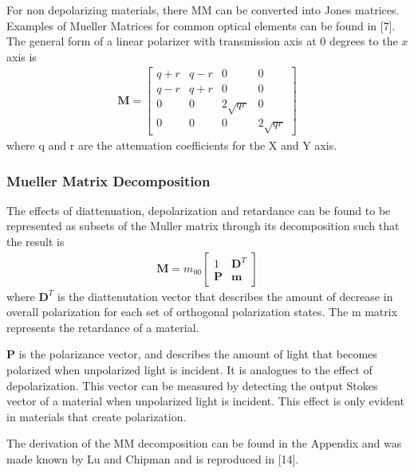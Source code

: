 For non depolarizing materials, there MM can be converted into Jones matrices.   Examples of Mueller Matrices for common optical elements can be found in [7].  The general form of a linear polarizer with transmission axis at 0 degrees to the $x$ axis is
%
\begin{align}
    \mathbf{M} =
    \begin{bmatrix}
        q + r & q - r & 0 & 0 \\
        q-r & q+r & 0  & 0 \\
        0 & 0 & 2\sqrt{qr} & 0 \\
        0 & 0 & 0 & 2\sqrt{qr}
    \end{bmatrix}
\end{align}
%
where q and r are the attenuation coefficients for the X and Y axis.

\subsubsection{Mueller Matrix Decomposition}

The effects of diattenuation, depolarization and retardance can be found to be represented as subsets of the Muller matrix through its decomposition such that the result is
\begin{align}
    \mathbf{M} = m_{00}
    \begin{bmatrix}
        1 & \mathbf{D}^T \\
        \mathbf{P} & \mathbf{m}
    \end{bmatrix}
\end{align}
where $\mathbf{D}^T$ is the diattenutation vector that describes the amount of decrease in overall polarization for each set of orthogonal polarization states. The m matrix represents the retardance of a material.

$\mathbf{P}$ is the polarizance vector, and describes the amount of light that becomes polarized when unpolarized light is incident.  It is analogues to the effect of depolarization.  This vector can be measured by detecting the output Stokes vector of a material when unpolarized light is incident.  This effect is only evident in materials that create polarization.

The derivation of the MM decomposition can be found in the Appendix and was made known by Lu and Chipman and is reproduced in [14].

